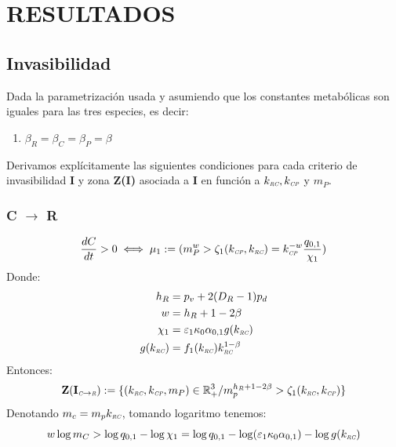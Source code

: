 \section{RESULTADOS}


\subsection{Invasibilidad}
Dada la parametrizaci\'on usada y asumiendo que los constantes metab\'olicas son iguales para las tres especies, es decir:
\begin{enumerate}
\item $\beta_R = \beta_C = \beta_P = \beta$
\end{enumerate}

Derivamos expl\'icitamente las siguientes condiciones para cada criterio de invasibilidad \textbf{I} y zona \textbf{Z(I)} asociada a \textbf{I} en funci\'on a $k_{\textit{\tiny RC}},k_{\textit{\tiny CP}}$ y $m_P$.

\subsubsection{C $\to$ R}

\begin{equation}
  \frac{dC}{dt} > 0 \iff  \mu_1 := (m_P^w > \zeta_1(k_{\textit{\tiny CP}},k_{\textit{\tiny RC}}) = k_{\textit{\tiny CP}}^{-w}\frac{q_{0,1}}{\chi_1})
\end{equation}
Donde:
\begin{equation}
  \begin{aligned}
    h_R &= p_v + 2(D_R - 1)p_d \\
    w &= h_R + 1 - 2 \beta \\
    \chi_1 &= \varepsilon_1 \kappa_0\alpha_{0,1} g(k_{\textit{\tiny RC}}) \\
    g(k_{\textit{\tiny RC}}) &= f_1(k_{\textit{\tiny RC}})k_{\textit{\tiny RC}}^{1-\beta}\\
  \end{aligned}
\end{equation}
Entonces:
\begin{equation}
\mathbf{Z(I_{\textit{\tiny C}\to \textit{\tiny R}})} := \{ (k_{\textit{\tiny RC}},k_{\textit{\tiny CP}},m_P) \in \mathbb{R}^3_+ / m_p^{h_R + 1 - 2\beta} > \zeta_1(k_{\textit{\tiny RC}},k_{\textit{\tiny CP}}) \}
\end{equation}
Denotando $m_c = m_pk_{\textit{\tiny RC}}$, tomando logaritmo tenemos:
\begin{equation}\label{eq:CONDIC-RLog}
 w \log m_C > \log{q_{0,1}} - \log \chi_1 = \log{q_{0,1}} -\log(\varepsilon_1\kappa_0 \alpha_{0,1}) - \log{g(k_{\textit{\tiny RC}})} 
\end{equation}


